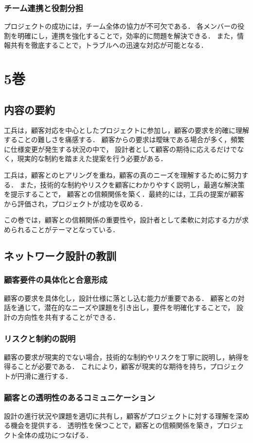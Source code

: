 \documentclass[titlepage,a4paper]{jsarticle}
\begin{document}
\subsubsection{チーム連携と役割分担}
プロジェクトの成功には，チーム全体の協力が不可欠である．
各メンバーの役割を明確にし，連携を強化することで，効率的に問題を解決できる．
また，情報共有を徹底することで，トラブルへの迅速な対応が可能となる．
\newpage
\section{5巻}
\subsection{内容の要約}
工兵は，顧客対応を中心としたプロジェクトに参加し，顧客の要求を的確に理解することの難しさを痛感する．
顧客からの要求は曖昧である場合が多く，頻繁に仕様変更が発生する状況の中で，
設計者として顧客の期待に応えるだけでなく，現実的な制約を踏まえた提案を行う必要がある．

工兵は，顧客とのヒアリングを重ね，顧客の真のニーズを理解するために努力する．
また，技術的な制約やリスクを顧客にわかりやすく説明し，最適な解決策を提示することで，
顧客との信頼関係を築く．最終的には，工兵の提案が顧客から評価され，プロジェクトが成功を収める．

この巻では，顧客との信頼関係の重要性や，設計者として柔軟に対応する力が求められることがテーマとなっている．

\subsection{ネットワーク設計の教訓}
\subsubsection{顧客要件の具体化と合意形成}
顧客の要求を具体化し，設計仕様に落とし込む能力が重要である．
顧客との対話を通じて，潜在的なニーズや課題を引き出し，要件を明確化することで，
設計の方向性を共有することができる．

\subsubsection{リスクと制約の説明}
顧客の要求が現実的でない場合，技術的な制約やリスクを丁寧に説明し，納得を得ることが必要である．
これにより，顧客が現実的な期待を持ち，プロジェクトが円滑に進行する．

\subsubsection{顧客との透明性のあるコミュニケーション}
設計の進行状況や課題を適切に共有し，顧客がプロジェクトに対する理解を深める機会を提供する．
透明性を保つことで，顧客との信頼関係を築き，プロジェクト全体の成功につなげる．
\end{document}
